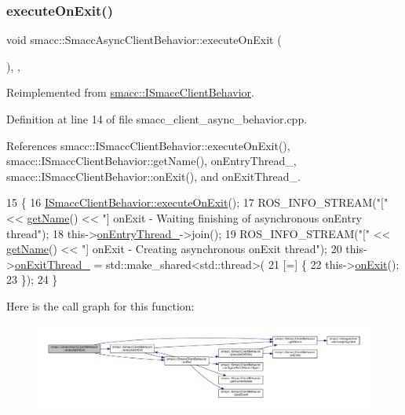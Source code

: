 \subsubsection{\texorpdfstring{execute\+On\+Exit()}{executeOnExit()}}
{\footnotesize\ttfamily void smacc\+::\+Smacc\+Async\+Client\+Behavior\+::execute\+On\+Exit (\begin{DoxyParamCaption}{ }\end{DoxyParamCaption})\hspace{0.3cm}{\ttfamily [override]}, {\ttfamily [protected]}, {\ttfamily [virtual]}}



Reimplemented from \hyperlink{classsmacc_1_1ISmaccClientBehavior_ac88fbad78c928b4bca6d18659ddfd8c0}{smacc\+::\+I\+Smacc\+Client\+Behavior}.



Definition at line 14 of file smacc\+\_\+client\+\_\+async\+\_\+behavior.\+cpp.



References smacc\+::\+I\+Smacc\+Client\+Behavior\+::execute\+On\+Exit(), smacc\+::\+I\+Smacc\+Client\+Behavior\+::get\+Name(), on\+Entry\+Thread\+\_\+, smacc\+::\+I\+Smacc\+Client\+Behavior\+::on\+Exit(), and on\+Exit\+Thread\+\_\+.


\begin{DoxyCode}
15     \{
16         \hyperlink{classsmacc_1_1ISmaccClientBehavior_ac88fbad78c928b4bca6d18659ddfd8c0}{ISmaccClientBehavior::executeOnExit}();
17         ROS\_INFO\_STREAM(\textcolor{stringliteral}{"["} << \hyperlink{classsmacc_1_1ISmaccClientBehavior_a18e4bec9460b010f2894c0f7e7064a34}{getName}() << \textcolor{stringliteral}{"] onExit - Waiting finishing of asynchronous onEntry
       thread"});
18         this->\hyperlink{classsmacc_1_1SmaccAsyncClientBehavior_a8b7bacf092d8b4de0bb3764bae43c181}{onEntryThread\_}->join();
19         ROS\_INFO\_STREAM(\textcolor{stringliteral}{"["} << \hyperlink{classsmacc_1_1ISmaccClientBehavior_a18e4bec9460b010f2894c0f7e7064a34}{getName}() << \textcolor{stringliteral}{"] onExit - Creating asynchronous onExit thread"});
20         this->\hyperlink{classsmacc_1_1SmaccAsyncClientBehavior_af2e2b5e95d8281c605fa06e51aad5d00}{onExitThread\_} = std::make\_shared<std::thread>(
21             [=] \{
22                 this->\hyperlink{classsmacc_1_1ISmaccClientBehavior_a36bf771905e3bf750909a15e4215a9b3}{onExit}();
23             \});
24     \}
\end{DoxyCode}
Here is the call graph for this function\+:
\nopagebreak
\begin{figure}[H]
\begin{center}
\leavevmode
\includegraphics[width=350pt]{classsmacc_1_1SmaccAsyncClientBehavior_a3d982d370df4f133ad37c0b2370e9b82_cgraph}
\end{center}
\end{figure}


